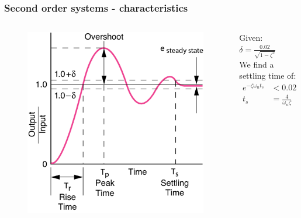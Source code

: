 \begin{frame}
\frametitle{Second order systems - characteristics}

\begin{columns}
\hspace{-2em}
	\begin{column}{0.6\textwidth}
		\begin{figure}
			\vspace{-1em}
			\includegraphics[width=0.9\linewidth]{Afbeelding7}
		\end{figure}
	\end{column}
		
	\begin{column}{0.4\textwidth}
		\vspace{-0.5em}
		\begin{example}
			Given: $\delta = \frac{0.02}{\sqrt{1-\zeta^2}}$\\
			We find a settling time of:
			\begin{align*}
			e^{-\zeta\omega_n t_s} &< 0.02\\
			t_s &= \frac{4}{\omega_n\zeta}
			\end{align*}
		\end{example}
	\end{column}

\end{columns}
\end{frame}

